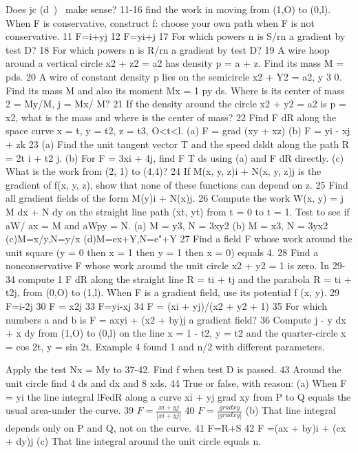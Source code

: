 Does jc (d~)~ make sense?
11-16 find the work in moving from (1,O) to (0,l). When F
is conservative, construct f: choose your own path when F is
not conservative.
11 F=i+yj 12 F=yi+j
17 For which powers n is S/rn a gradient by test D?
18 For which powers n is R/rn a gradient by test D?
19 A wire hoop around a vertical circle x2 + z2 = a2 has
density p = a + z. Find its mass M = pds.
20 A wire of constant density p lies on the semicircle
x2 + Y2 = a2, y 3 0. Find its mass M and also its moment
Mx = 1 py ds. Where is its center of mass 2 = My/M, j = Mx/
M?
21 If the density around the circle x2 + y2 = a2 is p = x2, what
is the mass and where is the center of mass?
22 Find F dR along the space curve x = t, y = t2, z = t3,
O<t<l.
(a) F = grad (xy + xz) (b) F = yi - xj + zk
23 (a) Find the unit tangent vector T and the speed dsldt
along the path R = 2t i + t2 j.
(b) For F = 3xi + 4j, find F T ds using (a) and F dR
directly.
(c) What is the work from (2, 1) to (4,4)?
24 If M(x, y, z)i + N(x, y, z)j is the gradient of f(x, y, z), show
that none of these functions can depend on z.
25 Find all gradient fields of the form M(y)i + N(x)j.
26 Compute the work W(x, y) = j M dx + N dy on the
straight line path (xt, yt) from t = 0 to t = 1. Test to see if aW/
ax = M and aWpy = N.
(a) M = y3, N = 3xy2 (b) M = x3, N = 3yx2
(c)M=x/y,N=y/x (d)M=ex+Y,N=e"+Y
27 Find a field F whose work around the unit square (y = 0
then x = 1 then y = 1 then x = 0) equals 4.
28 Find a nonconservative F whose work around the unit
circle x2 + y2 = 1 is zero.
In 29-34 compute 1 F dR along the straight line R = ti + tj
and the parabola R = ti + t2j, from (0,O) to (1,l). When F is a
gradient field, use its potential f (x, y).
29 F=i-2j 30 F = x2j
33 F=yi-xj 34 F = (xi + yj)/(x2 + y2 + 1)
35 For which numbers a and b is F = axyi + (x2 + by)j a
gradient field?
36 Compute j - y dx + x dy from (1,O) to (0,l) on the line
x = 1 - t2, y = t2 and the quarter-circle x = cos 2t, y = sin 2t.
Example 4 found 1 and n/2 with different parameters. 

Apply the test Nx = My to 37-42. Find f when test D is passed. 43 Around the unit circle find 4 ds and  dx and 8 xds.
44 True or false, with reason:
(a) When F = yi the line integral lFedR along a curve
xi + yj grad xy from P to Q equals the usual area-under the curve.
39 $F = \frac{xi+yj}{|xi+yj|}$ 40 $F = \frac{grad xy}{|grad xy|}$
(b) That line integral depends only on P and Q, not on the
curve.
41 F=R+S 42 F =(ax + by)i + (cx + dy)j (c) That line integral around the unit circle equals n. 

